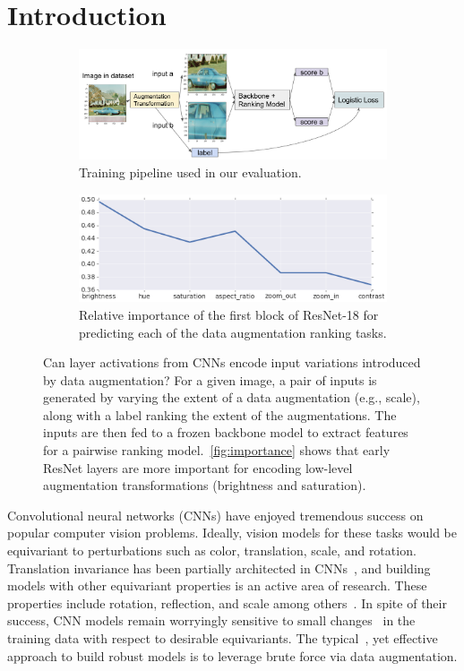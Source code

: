 \section{Introduction}
\begin{figure}[t]
\begin{subfigure}[h]{\textwidth}
\includegraphics[width=\textwidth]{diagrams/training.png}
\caption{Training pipeline used in our evaluation.}
\label{fig:overview}
\end{subfigure}
\begin{subfigure}[h]{\textwidth}
\includegraphics[width=\textwidth]{figures/first_block.png}
\caption{Relative importance of the first block of ResNet-18 for predicting each of the data augmentation ranking tasks.}
\label{fig:importance}
\end{subfigure}
\caption{Can layer activations from CNNs encode input variations introduced by data augmentation? For a given image, a pair of inputs is generated by varying the extent of a data augmentation (e.g., scale), along with a label ranking the extent of the augmentations. The inputs are then fed to a frozen backbone model to extract features for a pairwise ranking model.~\autoref{fig:importance} shows that early ResNet layers are more important for encoding low-level augmentation transformations (brightness and saturation).}
\label{fig:training}
\end{figure}
Convolutional neural networks (CNNs) have enjoyed tremendous success on popular computer vision problems.
Ideally, vision models for these tasks would be equivariant to perturbations such as color, translation, scale, and rotation.
Translation invariance has been partially architected in CNNs~\cite{pmlr-v97-zhang19a}, and building models with other equivariant properties is an active area of research.
These properties include rotation, reflection, and scale among others~\cite{xu2014scale, kanazawa2014locally, cohen2016group, sosnovik2019scale, zhu2019scale, kondor2018generalization}.
In spite of their success, CNN models remain worryingly sensitive to small changes~\cite{goodfellow2014explaining} in the training data with respect to desirable equivariants.
The typical~\cite{krizhevsky2012imagenet}, yet effective ~\cite{zhang2016understanding} approach to build robust models is to leverage brute force via data augmentation.

